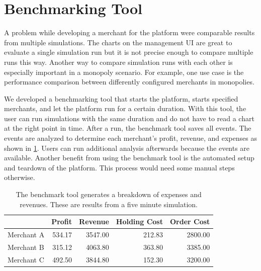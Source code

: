 \section{Benchmarking Tool}
\label{section:benchmark_tool}
A problem while developing a merchant for the \pricewars platform were comparable results from multiple simulations.
The charts on the management UI are great to evaluate a single simulation run but it is not precise enough to compare multiple runs this way.
Another way to compare simulation runs with each other is especially important in a monopoly scenario.
For example, one use case is the performance comparison between
differently configured merchants in monopolies.

We developed a benchmarking tool that starts the platform, starts specified merchants, and let the platform run for a certain duration.
With this tool, the user can run simulations with the same duration and do not have to read a chart at the right point in time.
After a run, the benchmark tool saves all events.
The events are analyzed to determine each merchant's profit, revenue, and expenses as shown in \cref{tab:benchmark_tool}.
Users can run additional analysis afterwards because the events are available.
Another benefit from using the benchmark tool is the automated setup and teardown of the platform.
This process would need some manual steps otherwise.

\begin{table}[t]
\centering
\begin{tabular}{ @{}lrrrr@{} }
	\hline
	& Profit & Revenue & Holding Cost & Order Cost \\
	\hline
	Merchant A & 534.17 & 3547.00 & 212.83 & 2800.00 \\
	Merchant B & 315.12 & 4063.80 & 363.80 & 3385.00 \\
	Merchant C & 492.50 & 3844.80 & 152.30 & 3200.00 \\
	\hline
\end{tabular}
\caption{The benchmark tool generates a breakdown of expenses and revenues. These are results from a five minute simulation.}
\label{tab:benchmark_tool}
\end{table}
